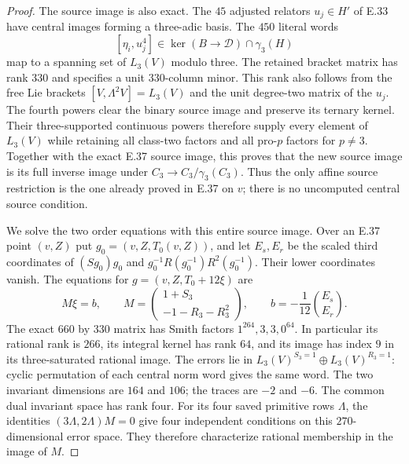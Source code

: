 \begin{proof}
The source image is also exact.  The $45$ adjusted
relators $u_j\in H'$ of E.33 have central images
forming a three-adic basis.  The $450$ literal
words
\[
                  [\eta_i,u_j^4]
       \in\ker(B\longrightarrow\mathscr D)
                       \cap\gamma_3(H)
 \tag{E.47.8}
\]
map to a spanning set of $L_3(V)$ modulo three.
The retained bracket matrix has rank $330$ and
specifies a unit $330$-column minor.  This rank
also follows from the free Lie brackets
$[V,\Lambda^2V]=L_3(V)$ and the unit degree-two
matrix of the $u_j$.  The fourth powers clear
the binary source image and preserve its ternary
kernel.  Their three-supported continuous powers
therefore supply every element of $L_3(V)$ while
retaining all class-two factors and all pro-$p$
factors for $p\ne3$.
Together with the exact E.37 source image, this
proves that the new source image is its full
inverse image under $C_3\to C_3/\gamma_3(C_3)$.
Thus the only affine source restriction is the
one already proved in E.37 on $v$; there is no
uncomputed central source condition.

We solve the two order equations with this
entire source image.  Over an E.37 point $(v,Z)$
put $g_0=(v,Z,T_0(v,Z))$, and let $E_s,E_r$ be
the scaled third coordinates of
$(Sg_0)g_0$ and
$g_0^{-1}R(g_0^{-1})R^2(g_0^{-1})$.
Their lower coordinates vanish.  The equations
for $g=(v,Z,T_0+12\xi)$ are
\[
 M\xi=b,\qquad
 M=\begin{pmatrix}1+S_3\\-1-R_3-R_3^2\end{pmatrix},
 \qquad b=-\frac1{12}\binom{E_s}{E_r}.
 \tag{E.47.9}
\]
The exact $660$ by $330$ matrix has Smith factors
$1^{264},3,3,0^{64}$.  In particular its rational
rank is $266$, its integral kernel has rank $64$,
and its image has index $9$ in its three-saturated
rational image.
The errors lie in
$L_3(V)^{S_3=1}\oplus L_3(V)^{R_3=1}$:
cyclic permutation of each central norm word
gives the same word.  The two invariant dimensions
are $164$ and $106$; the traces are $-2$ and $-6$.
The common dual invariant space has rank four.
For its four saved primitive rows $\Lambda$, the
identities
$(3\Lambda,2\Lambda)M=0$ give four independent
conditions on this $270$-dimensional error space.
They therefore characterize rational membership
in the image of $M$.


\end{proof}
